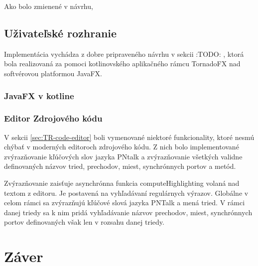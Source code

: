 Ako bolo zmienené v návrhu, 

\section{Uživateľské rozhranie}

Implementácia vychádza z dobre pripraveného návrhu v sekcii :TODO: , ktorá bola realizovaná za pomoci kotlinovského aplikačného rámcu TornadoFX nad softvérovou platformou JavaFX.

\subsection{JavaFX v kotline} 

\subsection{Editor Zdrojového kódu}

V sekcii \ref{sec:TR-code-editor} boli vymenované niektoré funkcionality, ktoré nesmú chýbať v moderných editoroch zdrojového kódu. Z nich bolo implementované zvýrazňovanie kľúčových slov jazyka PNtalk a zvýrazňovanie všetkých validne definovaných názvov tried, prechodov, miest, synchrónnych portov a metód.

Zvýrazňovanie zaisťuje asynchrónna funkcia computeHighlighting volaná nad textom z editoru. Je postavená na vyhľadávaní regulárnych výrazov. Globálne v celom rámci sa zvýrazňujú kľúčové slová jazyka PNTalk a mená tried. V rámci danej triedy sa k nim pridá vyhľadávanie názvov prechodov, miest, synchrónnych portov definovaných však len v rozsahu danej triedy.

\chapter{Záver}

